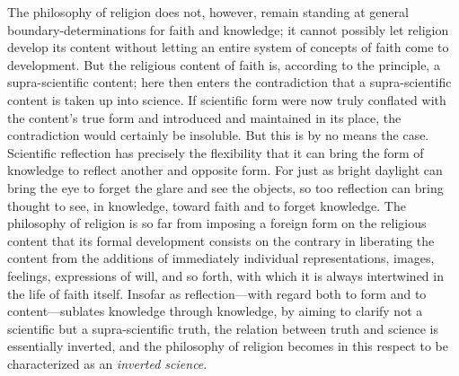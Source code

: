 \documentclass[12pt,a4paper]{article}
\begin{document}
The philosophy of religion does not, however, remain standing at
general boundary-determinations for faith and knowledge; it
cannot possibly let religion develop its content without letting
an entire system of concepts of faith come to development. But
the religious content of faith is, according to the principle,
a supra-scientific content; here then enters the contradiction
that a supra-scientific content is taken up into science. If
scientific form were now truly conflated with the content's true
form and introduced and maintained in its place, the
contradiction would certainly be insoluble. But this is by no
means the case. Scientific reflection has precisely the
flexibility that it can bring the form of knowledge to reflect
another and opposite form. For just as bright daylight can bring
the eye to forget the glare and see the objects, so too
reflection can bring thought to see, in knowledge, toward faith
and to forget knowledge. The philosophy of religion is so far
from imposing a foreign form on the religious content that its
formal development consists on the contrary in liberating the
content from the additions of immediately individual
representations, images, feelings, expressions of will, and so
forth, with which it is always intertwined in the life of faith
itself. Insofar as reflection---with regard both to form and to
content---sublates knowledge through knowledge, by aiming to
clarify not a scientific but a supra-scientific truth, the
relation between truth and science is essentially inverted, and
the philosophy of religion becomes in this respect to be
characterized as an \emph{inverted science}.
\end{document}
